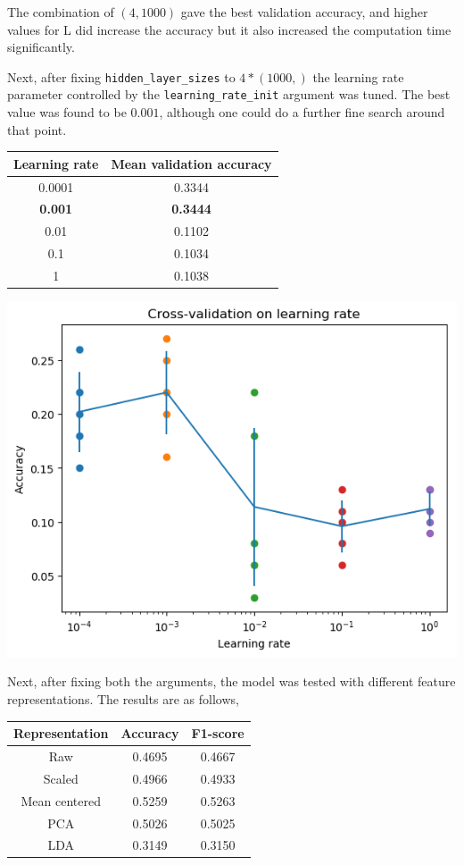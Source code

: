 \documentclass[12pt]{article}
\begin{document}
The combination of $(4,1000)$ gave the best validation accuracy, and higher values for L did increase the accuracy but it also increased the computation time significantly.

\noindent Next, after fixing \texttt{hidden\_layer\_sizes} to $4 * (1000,)$ the learning rate parameter controlled by the \texttt{learning\_rate\_init} argument was tuned. The best value was found to be $0.001$, although one could do a further fine search around that point.

\begin{center}
\begin{tabular}{|c|c|}
 \hline
 Learning rate & Mean validation accuracy \\
 \hline
 0.0001 & 0.3344\\
 \textbf{0.001} & \textbf{0.3444}\\
 0.01 & 0.1102\\
 0.1 & 0.1034\\
 1 & 0.1038\\
 \hline
\end{tabular}
\end{center}

\begin{center}
\includegraphics[scale=0.6]{mlp-lr.png}
\end{center}

Next, after fixing both the arguments, the model was tested with different feature representations. The results are as follows,

\begin{center}
  \begin{tabular}{|c|c|c|}
    \hline
    Representation & Accuracy & F1-score \\
    \hline
    Raw & 0.4695 & 0.4667\\
    Scaled & 0.4966 & 0.4933 \\
    Mean centered & 0.5259 & 0.5263\\
    PCA & 0.5026 & 0.5025\\
    LDA & 0.3149 & 0.3150 \\
    \hline
  \end{tabular}
\end{center}
\end{document}
